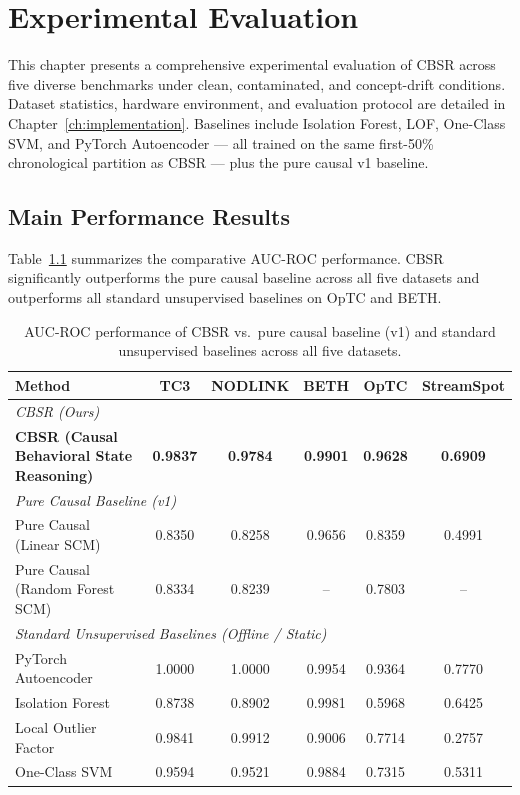 \chapter{Experimental Evaluation}
\label{ch:evaluation}

This chapter presents a comprehensive experimental evaluation of CBSR across five diverse
benchmarks under clean, contaminated, and concept-drift conditions. Dataset statistics,
hardware environment, and evaluation protocol are detailed in Chapter~\ref{ch:implementation}.
Baselines include Isolation Forest, LOF, One-Class SVM, and PyTorch Autoencoder --- all trained
on the same first-50\% chronological partition as CBSR --- plus the pure causal v1 baseline.


\section{Main Performance Results}
\label{sec:main_results}

Table~\ref{tab:performance} summarizes the comparative AUC-ROC performance. CBSR significantly
outperforms the pure causal baseline across all five datasets and outperforms all standard
unsupervised baselines on OpTC and BETH.

\begin{table}[t]
\centering
\caption{AUC-ROC performance of CBSR vs.\ pure causal baseline (v1) and standard unsupervised
baselines across all five datasets.}
\begin{tabularx}{\textwidth}{Xccccc}
\toprule
Method & TC3 & NODLINK & BETH & OpTC & StreamSpot \\
\midrule
\multicolumn{6}{l}{\textit{CBSR (Ours)}} \\
\textbf{CBSR (Causal Behavioral State Reasoning)} & \textbf{0.9837} & \textbf{0.9784} & \textbf{0.9901} & \textbf{0.9628} & \textbf{0.6909} \\
\midrule
\multicolumn{6}{l}{\textit{Pure Causal Baseline (v1)}} \\
Pure Causal (Linear SCM) & 0.8350 & 0.8258 & 0.9656 & 0.8359 & 0.4991 \\
Pure Causal (Random Forest SCM) & 0.8334 & 0.8239 & -- & 0.7803 & -- \\
\midrule
\multicolumn{6}{l}{\textit{Standard Unsupervised Baselines (Offline / Static)}} \\
PyTorch Autoencoder & 1.0000 & 1.0000 & 0.9954 & 0.9364 & 0.7770 \\
Isolation Forest    & 0.8738 & 0.8902 & 0.9981 & 0.5968 & 0.6425 \\
Local Outlier Factor & 0.9841 & 0.9912 & 0.9006 & 0.7714 & 0.2757 \\
One-Class SVM       & 0.9594 & 0.9521 & 0.9884 & 0.7315 & 0.5311 \\
\bottomrule
\end{tabularx}
\label{tab:performance}
\end{table}

